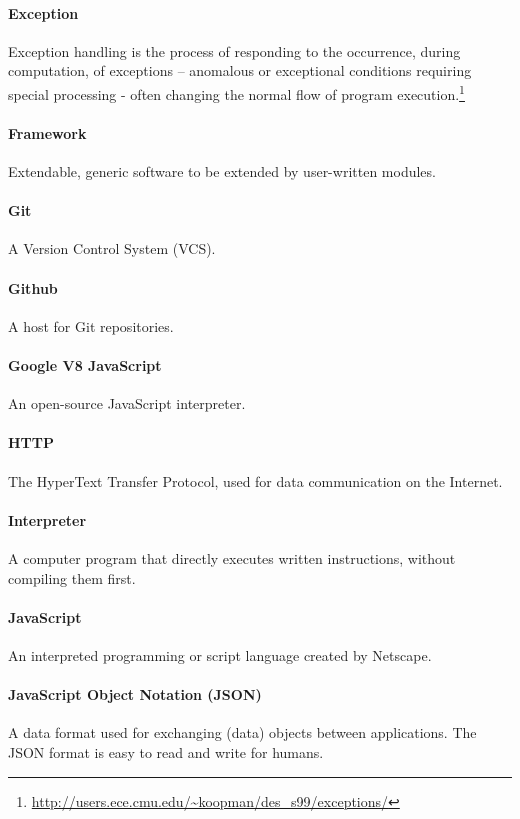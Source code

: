 \paragraph{Exception}
Exception handling is the process of responding to the occurrence, during computation, of exceptions – anomalous or exceptional conditions requiring special processing - often changing the normal flow of program execution.\footnote{\url{http://users.ece.cmu.edu/~koopman/des_s99/exceptions/}}

\paragraph{Framework}
Extendable, generic software to be extended by user-written modules.

\paragraph{Git}
A Version Control System (VCS).

\paragraph{Github}
A host for Git repositories.

\paragraph{Google V8 JavaScript}
An open-source JavaScript interpreter.

\paragraph{HTTP}
The HyperText Transfer Protocol, used for data communication on the Internet.

\paragraph{Interpreter}
A computer program that directly executes written instructions, without compiling them first.

\paragraph{JavaScript}
An interpreted programming or script language created by Netscape.

\paragraph{JavaScript Object Notation (JSON)}
A data format used for exchanging (data) objects between applications. The JSON format is easy to read and write for humans.

